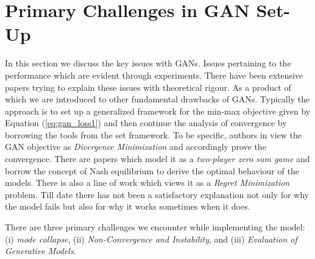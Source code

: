 

\section{Primary Challenges in GAN Set-Up}
\label{sec:challenges}
In this section we discuss the key issues with GANs. Issues pertaining to the performance which are evident through experiments. There have been extensive papers trying to explain these issues with theoretical rigour. As a product of which we are introduced to other fundamental drawbacks of GANs. Typically the approach is to set up a generalized framework for the min-max objective given by Equation (\ref{eq:gan_loss1}) and then continue the analysis of convergence by borrowing the tools from the set framework. To be specific, authors in \citep{fgan} view the GAN objective as \textit{Divergence Minimization} and accordingly prove the convergence. There are papers which model it as a \textit{two-player zero sum game} and borrow the concept of Nash equilibrium to derive the optimal behaviour of the models. There is also a line of work which views it as a \textit{Regret Minimization} problem. Till date there has not been a satisfactory explanation not only for why the model fails but also for why it works sometimes when it does. 

There are three primary challenges we encounter while implementing the model: (i) \emph{mode collapse}, (ii) \emph{Non-Convergence and Instability}, and (iii) \emph{Evaluation of Generative Models}.
